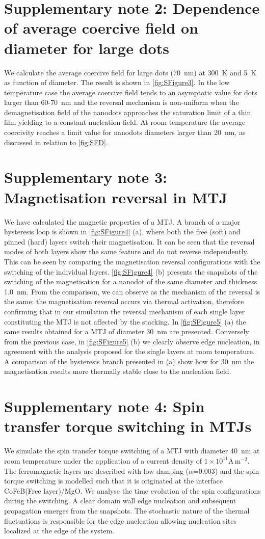 \documentclass[aps,prb,signlecolumn,preprint,superscriptaddress,10]{revtex4-1}
\begin{document}
\section*{Supplementary note 2: Dependence of average coercive field on diameter for large dots}
We calculate the average coercive field for large dots (70~nm) at 300~K and 5~K as function of diameter. The result is shown in \ref{fig:SFigure3}. In the low temperature case the average coercive field tends to an asymptotic value for dots larger than 60-70~nm and the reversal mechanism is non-uniform when the demagnetisation field of the nanodots approaches the saturation limit of a thin film yielding to a constant nucleation field. At room temperature the average coercivity reaches a limit value for nanodots diameters larger than 20~nm, as discussed in relation to \ref{fig:SFD}.
\section*{Supplementary note 3: Magnetisation reversal in MTJ}
We have calculated the magnetic properties of a MTJ. A branch of a major hysteresis loop is shown in \ref{fig:SFigure4} (a), where both the free (soft) and pinned (hard) layers switch their magnetisation. It can be seen that the reversal modes of both layers show the same feature and do not reverse independently. This can be seen by comparing the magnetisation reversal configurations with the switching of the individual layers. \ref{fig:SFigure4} (b) presents the snapshots of the switching of the magnetisation for a nanodot of the same diameter and thickness 1.0~nm. From the comparison, we can observe as the mechanism of the reversal is the same: the magnetisation reversal occurs via thermal activation, therefore confirming that in our simulation the reversal mechanism of each single layer constituting the MTJ is not affected by the stacking. In \ref{fig:SFigure5} (a) the same results obtained for a MTJ of diameter 30~nm are presented. Conversely from the previous case, in \ref{fig:SFigure5} (b) we clearly observe edge nucleation, in agreement with the analysis proposed for the single layers at room temperature. A comparison of the hysteresis branch presented in (a) show how for 30~nm the magnetisation results more thermally stable close to the nucleation field.
\section*{Supplementary note 4: Spin transfer torque switching in MTJs}
We simulate the spin transfer torque switching of a MTJ with diameter 40~nm at room temperature under the application of a current density of $1\times 10^{11} \mathrm{A}\,\mathrm{m}^{-2}$.
The ferromagnetic layers are described with low damping ($\alpha$=0.003) and the spin torque switching is modelled such that it is originated at the interface CoFeB(Free layer)/MgO. We analyse the time evolution of the spin configurations during the switching. A clear domain wall edge nucleation and subsequent propagation emerges from the snapshots. The stochastic nature of the thermal fluctuations is responsible for the edge nucleation allowing nucleation sites localized at the edge of the system. 
\pagebreak
\end{document}
